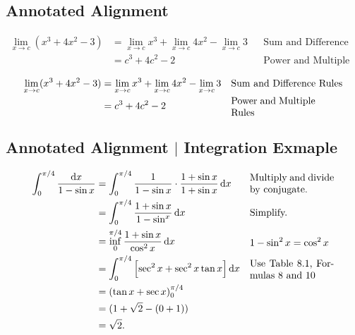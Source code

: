 \documentclass{article}
\begin{document}
	
	\subsection*{Annotated Alignment}
	\begin{align*}
		\lim_{x\to c}(x^3 + 4x^2 - 3) &= \lim_{x\to c}x^3 + \lim_{x\to c}4x^2 - \lim_{x\to c} 3  && \text{Sum and Difference Rules}\\
			&= c^3 + 4c^2 - 2 && \text{Power and Multiple Rules}
	\end{align*}
	
	\begin{align*}
		\lim_{x\to c}(x^3 + 4x^2 - 3) &= \lim_{x\to c}x^3 + \lim_{x\to c}4x^2 - \lim_{x\to c} 3  && \text{Sum and Difference Rules}\\
		&= c^3 + 4c^2 - 2 && \text{\parbox{3cm}{Power and Multiple Rules}}
	\end{align*}


	\subsection*{Annotated Alignment $\vert$ Integration Exmaple}


	\begin{align*}
		\int_{0}^{\pi/4} \frac{\dif x}{1-\sin{x}} &= \int_{0}^{\pi/4} \frac{1}{1-\sin{x}} \cdot \frac{1+\sin{x}}{1+\sin{x}} \dif x && \text{\parbox{3cm}{Multiply and divide by conjugate.}} \\
		&= \int_{0}^{\pi/4} \frac{1+\sin{x}}{1-\sin^{x}} \dif x && \text{Simplify.} \\
		&= \inf_{0}^{\pi/4} \frac{1+\sin{x}}{\cos^2{x}} \dif x && \text{\parbox{3cm}{$1-\sin^2{x} = \cos^2{x}$}} \\
		&= \int_{0}^{\pi/4} \left[ \sec^2{x} + \sec^2{x} \tan{x}  \right] \dif x && \text{\parbox{3cm}{Use Table 8.1, Formulas 8 and 10}} \\
		&= (\tan{x} + \sec{x})_0^{\pi/4} \\
		&= (1 + \sqrt{2} - (0+1)) \\
		&= \sqrt{2}.
	\end{align*}
	


























	
\end{document}
